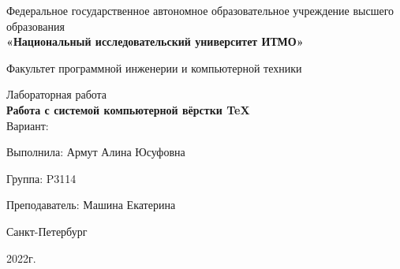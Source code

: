 \begin{center}
    Федеральное государственное автономное образовательное учреждение высшего образования\\
\textbf{«Национальный исследовательский
    университет ИТМО»}
    
\vspace{1em}
    Факультет программной инженерии и компьютерной техники
    \vspace{15em}

    {\large Лабораторная работа }\\
    {\Large \textbf{Работа с системой компьютерной вёрстки \TeX}}\\[1em]
    Вариант: 
    \vspace{15em}
\begin{flushright}
    Выполнила: Армут Алина Юсуфовна 
    
    Группа: P3114

    Преподаватель: Машина Екатерина

\end{flushright}
\vspace{7em}
\begin{center}
    Санкт-Петербург

    2022г.
\end{center}
\end{center}
